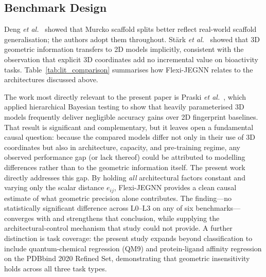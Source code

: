 \documentclass[pdflatex,sn-vancouver-num]{sn-jnl}%
\theoremstyle{thmstyleone}%
\theoremstyle{thmstyletwo}%
\theoremstyle{thmstylethree}%
\begin{document}
\subsection{Benchmark Design}

Deng \emph{et al.}\ \cite{deng2023systematic} showed that Murcko scaffold
splits better reflect real-world scaffold generalisation; the authors
adopt them throughout.  Stärk \emph{et al.}\ \cite{stark2022infomax}
showed that 3D geometric information transfers to 2D models implicitly,
consistent with the observation that explicit 3D coordinates add no
incremental value on bioactivity tasks.  Table~\ref{tab:lit_comparison}
summarises how Flexi-JEGNN relates to the architectures discussed above.

The work most directly relevant to the present paper is Praski \emph{et al.}~\cite{praski2025benchmarking}, which applied hierarchical Bayesian testing to show that heavily parameterised 3D models frequently deliver negligible accuracy gains over 2D fingerprint baselines.  That result is significant and complementary, but it leaves open a fundamental causal question: because the compared models differ not only in their use of 3D coordinates but also in architecture, capacity, and pre-training regime, any observed performance gap (or lack thereof) could be attributed to modelling differences rather than to the geometric information itself.  The present work directly addresses this gap.  By holding \emph{all} architectural factors constant and varying only the scalar distance $e_{ij}$, Flexi-JEGNN provides a clean causal estimate of what geometric precision alone contributes.  The finding---no statistically significant difference across L0--L3 on any of six benchmarks---converges with and strengthens that conclusion, while supplying the architectural-control mechanism that study could not provide.  A further distinction is task coverage: the present study expands beyond classification to include quantum-chemical regression (QM9) and protein-ligand affinity regression on the PDBbind 2020 Refined Set, demonstrating that geometric insensitivity holds across all three task types.
\end{document}
